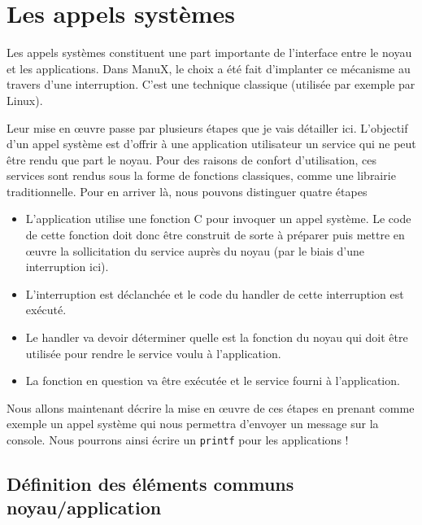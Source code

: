 \section{Les appels systèmes}

   Les appels systèmes constituent une part importante de l'interface
entre le noyau et les applications. Dans ManuX, le choix a été fait
d'implanter ce mécanisme au travers d'une interruption. C'est une
technique classique (utilisée par exemple par Linux).

   Leur mise en \oe{}uvre passe par plusieurs étapes que je vais
détailler ici. L'objectif d'un appel système est d'offrir à une
application utilisateur un service qui ne peut être rendu que part le
noyau. Pour des raisons de confort d'utilisation, ces services sont
rendus sous la forme de fonctions classiques, comme une librairie
traditionnelle. Pour en arriver là, nous pouvons distinguer quatre
étapes

\begin{itemize}
   \item L'application utilise une fonction C pour invoquer un appel
     système. Le code de cette fonction doit donc être construit de
     sorte à préparer puis mettre en \oe{}uvre la sollicitation du
     service auprès du noyau (par le biais d'une interruption ici).
   \item L'interruption est déclanchée et le code du handler de cette
     interruption est exécuté.
   \item Le handler va devoir déterminer quelle est la fonction du
     noyau qui doit être utilisée pour rendre le service voulu à
     l'application.
   \item La fonction en question va être exécutée et le service fourni
     à l'application.
\end{itemize}

   Nous allons maintenant décrire la mise en \oe{}uvre de ces étapes
en prenant comme exemple un appel système qui nous permettra d'envoyer
un message sur la console. Nous pourrons ainsi écrire un
\lstinline!printf! pour les applications !

\subsection{Définition des éléments communs noyau/application}

